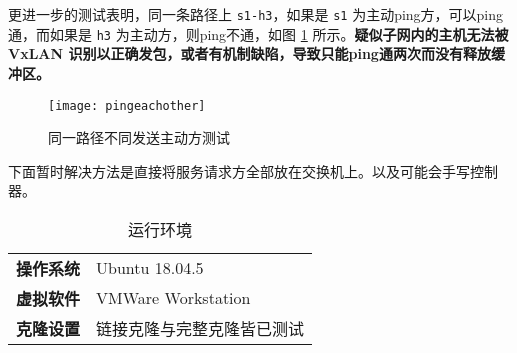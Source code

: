     更进一步的测试表明，同一条路径上 \verb"s1-h3"，如果是 \verb"s1" 为主动ping方，可以ping通，而如果是 \verb"h3" 为主动方，则ping不通，如图 \ref{fig:pingeachother} 所示。\textbf{疑似子网内的主机无法被 VxLAN 识别以正确发包，或者有机制缺陷，导致只能ping通两次而没有释放缓冲区。}
    
    \begin{figure}[H]
        \centering
        \texttt{[image: pingeachother]}
        \caption{同一路径不同发送主动方测试}\label{fig:pingeachother}
    \end{figure}

    下面暂时解决方法是直接将服务请求方全部放在交换机上。以及可能会手写控制器\cite{vxlannew}。

    \begin{table}[H]
        \centering
        \caption{运行环境}\label{tab:env}
        \begin{tabular}{>{\bfseries}cl}
            \toprule
            操作系统 & Ubuntu 18.04.5 \\
            虚拟软件 & VMWare Workstation \\
            克隆设置 & 链接克隆与完整克隆皆已测试 \\
            \bottomrule
        \end{tabular}
    \end{table}

    


